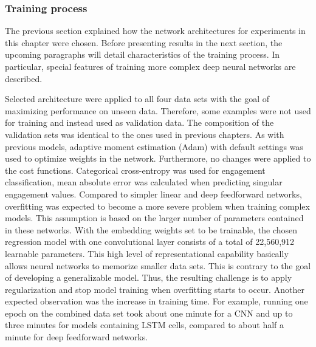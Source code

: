 \subsubsection{Training process}
\label{sub:comb_training_process}

The previous section explained how the network architectures for experiments
in this chapter were chosen.
Before presenting results in the next section, the upcoming paragraphs will
detail characteristics of the training process.
In particular, special features of training more complex deep neural networks
are described.

Selected architecture were applied to all four data sets with the goal of
maximizing performance on unseen data.
Therefore, some examples were not used for training and instead used as validation
data.
The composition of the validation sets was identical to the ones used in previous
chapters.
As with previous models, adaptive moment estimation (Adam) with default settings
was used to optimize weights in the network.
Furthermore, no changes were applied to the cost functions.
Categorical cross-entropy was used for engagement classification, mean absolute
error was calculated when predicting singular engagement values.
Compared to simpler linear and deep feedforward networks, overfitting was
expected to become a more severe problem when training complex models.
This assumption is based on the larger number of parameters contained in these
networks.
With the embedding weights set to be trainable, the chosen regression model
with one convolutional layer consists of a total of 22,560,912 learnable parameters.
This high level of representational capability basically allows neural networks
to memorize smaller data sets.
This is contrary to the goal of developing a generalizable model.
Thus, the resulting challenge is to apply regularization and stop model training
when overfitting starts to occur.
Another expected observation was the increase in training time.
For example, running one epoch on the combined data set took about one minute
for a CNN and up to three minutes for models containing LSTM cells, compared
to about half a minute for deep feedforward networks.

